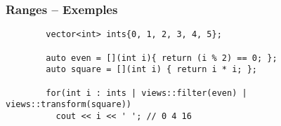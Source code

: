 \documentclass[C++.tex]{subfiles}
\begin{document}
\begin{frame}[fragile]
	\frametitle{Ranges -- Exemples}
	\begin{verbatim}
		vector<int> ints{0, 1, 2, 3, 4, 5};

		auto even = [](int i){ return (i % 2) == 0; };
		auto square = [](int i) { return i * i; };

		for(int i : ints | views::filter(even) | views::transform(square))
		  cout << i << ' '; // 0 4 16
  	\end{verbatim}

\end{frame}
\end{document}

